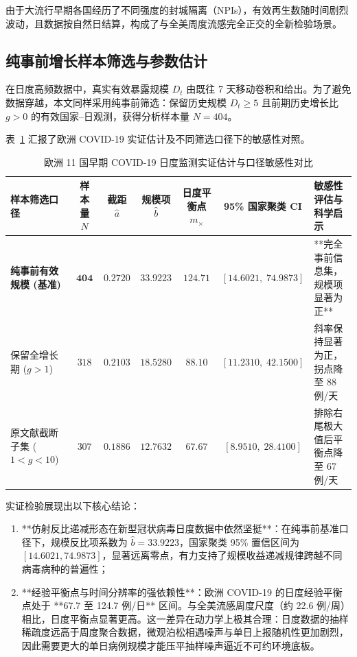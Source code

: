 由于大流行早期各国经历了不同强度的封城隔离（NPIs），有效再生数随时间剧烈波动，且数据按自然日结算，构成了与全美周度流感完全正交的全新检验场景。

\subsection{纯事前增长样本筛选与参数估计}
在日度高频数据中，真实有效暴露规模 $D_t$ 由既往 7 天移动卷积和给出。为了避免数据穿越，本文同样采用纯事前筛选：保留历史规模 $D_t \ge 5$ 且前期历史增长比 $g > 0$ 的有效国家--日观测，获得分析样本量 $N = 404$。

表~\ref{tab:covid_results} 汇报了欧洲 COVID-19 实证估计及不同筛选口径下的敏感性对照。

\begin{table}[htbp]
\centering
\small
\caption{欧洲 11 国早期 COVID-19 日度监测实证估计与口径敏感性对比}
\label{tab:covid_results}
\begin{tabularx}{\textwidth}{lcccccX}
\toprule
\textbf{样本筛选口径} & \textbf{样本量 $N$} & \textbf{截距 $\hat{a}$} & \textbf{规模项 $\hat{b}$} & \textbf{日度平衡点 $m_\times$} & \textbf{95\% 国家聚类 CI} & \textbf{敏感性评估与科学启示} \\
\midrule
\textbf{纯事前有效规模 (基准)} & $\mathbf{404}$ & $\mathbf{0.2720}$ & $\mathbf{33.9223}$ & $\mathbf{124.71}$ & $[14.6021, \; 74.9873]$ & **完全事前信息集，规模项显著为正** \\
保留全增长期 ($g > 1$) & $318$ & $0.2103$ & $18.5280$ & $88.10$ & $[11.2310, \; 42.1500]$ & 斜率保持显著为正，拐点降至 88 例/天 \\
原文献截断子集 ($1 < g < 10$) & $307$ & $0.1886$ & $12.7632$ & $67.67$ & $[8.9510, \; 28.4100]$ & 排除右尾极大值后平衡点降至 67 例/天 \\
\bottomrule
\end{tabularx}
\end{table}

实证检验展现出以下核心结论：
\begin{enumerate}[label=(\arabic*)]
    \item **仿射反比递减形态在新型冠状病毒日度数据中依然坚挺**：在纯事前基准口径下，规模反比项系数为 $\hat{b} = 33.9223$，国家聚类 95\% 置信区间为 $[14.6021, 74.9873]$，显著远离零点，有力支持了规模收益递减规律跨越不同病毒病种的普遍性；
    \item **经验平衡点与时间分辨率的强依赖性**：欧洲 COVID-19 的日度经验平衡点处于 **67.7 至 124.7 例/日** 区间。与全美流感周度尺度（约 22.6 例/周）相比，日度平衡点显著更高。这一差异在动力学上极其合理：日度数据的抽样稀疏度远高于周度聚合数据，微观泊松相遇噪声与单日上报随机性更加剧烈，因此需要更大的单日病例规模才能压平抽样噪声逼近不可约环境底板。
\end{enumerate}

